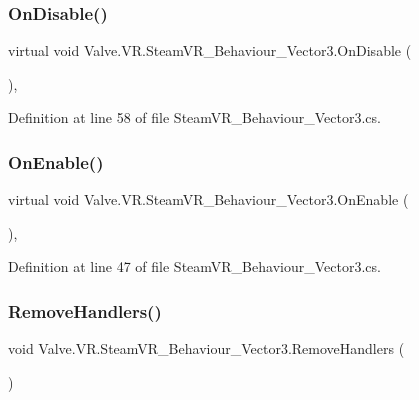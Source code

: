 \subsubsection{\texorpdfstring{OnDisable()}{OnDisable()}}
{\footnotesize\ttfamily virtual void Valve.\+V\+R.\+Steam\+V\+R\+\_\+\+Behaviour\+\_\+\+Vector3.\+On\+Disable (\begin{DoxyParamCaption}{ }\end{DoxyParamCaption})\hspace{0.3cm}{\ttfamily [protected]}, {\ttfamily [virtual]}}



Definition at line 58 of file Steam\+V\+R\+\_\+\+Behaviour\+\_\+\+Vector3.\+cs.

\mbox{\label{class_valve_1_1_v_r_1_1_steam_v_r___behaviour___vector3_ae448226b18a44152fdc5c1db0652423d}} 
\subsubsection{\texorpdfstring{OnEnable()}{OnEnable()}}
{\footnotesize\ttfamily virtual void Valve.\+V\+R.\+Steam\+V\+R\+\_\+\+Behaviour\+\_\+\+Vector3.\+On\+Enable (\begin{DoxyParamCaption}{ }\end{DoxyParamCaption})\hspace{0.3cm}{\ttfamily [protected]}, {\ttfamily [virtual]}}



Definition at line 47 of file Steam\+V\+R\+\_\+\+Behaviour\+\_\+\+Vector3.\+cs.

\mbox{\label{class_valve_1_1_v_r_1_1_steam_v_r___behaviour___vector3_a3c5518834ec1d2fd66991adb0be37a73}} 
\subsubsection{\texorpdfstring{RemoveHandlers()}{RemoveHandlers()}}
{\footnotesize\ttfamily void Valve.\+V\+R.\+Steam\+V\+R\+\_\+\+Behaviour\+\_\+\+Vector3.\+Remove\+Handlers (\begin{DoxyParamCaption}{ }\end{DoxyParamCaption})\hspace{0.3cm}{\ttfamily [protected]}}



